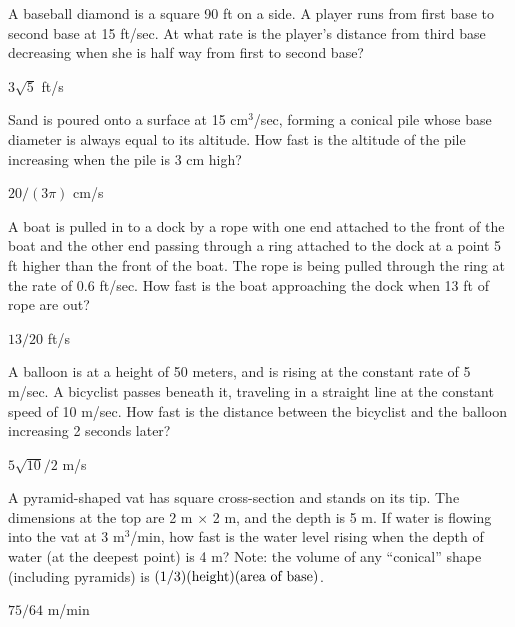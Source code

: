 \begin{exercises}
\begin{exercise}
A baseball diamond is a square 90 ft on a side.  A player runs from first
base to second base at 15 ft/sec.  At what rate is the player's distance
from third base decreasing when she is half way from first to second base?
\begin{answer} $3\sqrt5$ ft/s
\end{answer}\end{exercise}

\begin{exercise} Sand is poured onto a surface at 15 cm${}^3$/sec, forming a
conical pile whose base diameter is always equal to its altitude.  How
fast is the altitude of the pile increasing when the pile is 3 cm
high?
\begin{answer} $20/(3\pi)$ cm/s
\end{answer}\end{exercise}

\begin{exercise}
A boat is pulled in to a dock by a rope with one end attached to the front
of the boat and the other end passing through a ring attached to the dock
at a point 5 ft higher than the front of the boat.  The rope is being
pulled through the ring at the rate of 0.6 ft/sec.  How fast is the boat
approaching the dock when 13 ft of rope are out?
\begin{answer} $13/20$ ft/s
\end{answer}\end{exercise}

\begin{exercise}
A balloon is at a height of 50 meters, and is rising at the constant rate
of 5 m/sec.  A bicyclist passes beneath it, traveling in a
straight line at the constant speed of 10 m/sec.  How fast is the distance
between the bicyclist and the balloon increasing 2 seconds later?
\begin{answer} $5\sqrt{10}/2$ m/s
\end{answer}\end{exercise}

\begin{exercise} A pyramid-shaped vat has square cross-section and stands on its
tip.  The dimensions at the top are 2 m $\times$ 2 m, and the depth is
5 m.  If water is flowing into the vat at 3 m${}^3$/min, how fast is
the water level rising when the depth of water (at the deepest point)
is 4 m?  Note: the volume of any ``conical'' shape (including
pyramids) is $(1/3)(\hbox{height})(\hbox{area of base})$.
\begin{answer} $75/64$ m/min
\end{answer}\end{exercise}


\end{exercises}
